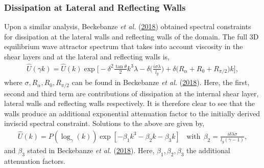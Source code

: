 \documentclass[a4paper]{article}
\numberwithin{equation}{section}
\begin{document}
\subsubsection{Dissipation at Lateral and Reflecting Walls}
Upon a similar analysis, Beckebanze \emph{et al.} (\hyperlink{ref 8}{2018}) obtained spectral constraints for dissipation at the lateral walls and reflecting walls of the domain. The full 3D equilibrium wave attractor spectrum that takes into account viscosity in the shear layers and at the lateral and reflecting walls is, 
\begin{align*}
\hat{U}(\gamma k) = \hat{U}(k)\exp\bigg[-\delta^2 \frac{\tan\theta}{2}k^3\lambda - \delta \big(\frac{i\sigma \lambda}{l_y}\big) + \delta\big(R_\alpha + R_0 + R_{\pi/2}\big)k \bigg],
\end{align*}
where $\sigma, R_\alpha, R_0, R_{\pi/2}$ can be found in Beckebanze \emph{et al.} (\hyperlink{ref 8}{2018}). Here, the first, second and third term are contributions of dissipation at the internal shear layer, lateral walls and reflecting walls respectively. It is therefore clear to see that the walls produce an additional exponential attenuation factor to the initially derived inviscid spectral constraint.
Solutions to the above are given by, 
\begin{align}\label{eq:4.15}
\hat{U}(k) = P(\log_\gamma(k))\exp[-\beta_1k^3 - \beta_2k -\beta_3k] ~~~~ \text{with}~~ \beta_2 = \frac{i\delta\lambda\sigma}{l_y(\gamma - 1)},
\end{align} 
and $\beta_3$ stated in Beckebanze \emph{et al.} (\hyperlink{ref 8}{2018}). Here, $\beta_1, \beta_2, \beta_3$ the additional attenuation factors.
\end{document}

